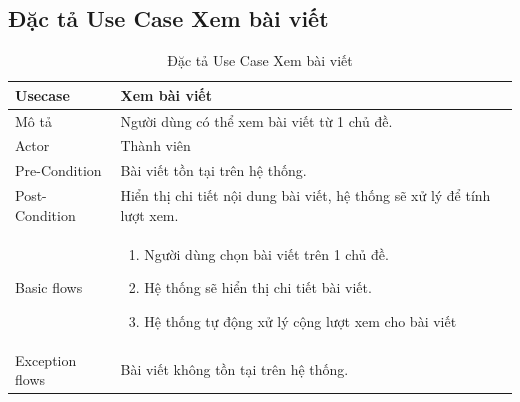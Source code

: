 \documentclass[../index.tex]{subfiles}
\begin{document}
        \subsection{Đặc tả Use Case Xem bài viết}
    \begin{table}[H]
        \centering
        {}
        \begin{tabular}{ |p{3cm}|p{9cm}| }
            \hline
            Usecase         & Xem bài viết                                                                                   \\
            \hline
            Mô tả           & Người dùng có thể xem bài viết từ 1 chủ đề.        \\
            \hline
            Actor           & Thành viên                                                                                  \\
            \hline
            Pre-Condition   & Bài viết tồn tại trên hệ thống.                                                               \\
            \hline
            Post-Condition  & Hiển thị chi tiết nội dung bài viết, hệ thống sẽ xử lý để tính lượt xem.                                                \\
            \hline
            Basic flows     & \begin{enumerate}
                \item Người dùng chọn bài viết trên 1 chủ đề.
                \item Hệ thống sẽ hiển thị chi tiết bài viết.
                \item Hệ thống tự động xử lý cộng lượt xem cho bài viết
            \end{enumerate} \\
            \hline
            Exception flows & Bài viết không tồn tại trên hệ thống.                                            \\
            \hline
        \end{tabular}
        \caption{Đặc tả Use Case Xem bài viết}
    \end{table}
\end{document}
